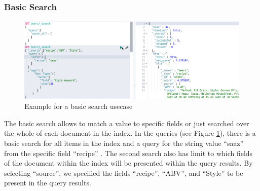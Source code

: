 \documentclass[bibliography=totoc]{article}
\begin{document}
\subsubsection{Basic Search}
\begin{figure}
    \includegraphics[height=0.4\textwidth]{basic_search.png}
    \caption{\label{beer_basic_search}Example for a basic search usecase} 
 \end{figure}
 The basic search allows to match a value to specific fields or just searched over 
 the whole of each document in the index. 
 In the queries (see Figure \ref{beer_basic_search}), there is a basic search for all items in the 
 index and a query for the string value “saaz” from the specific field 
 “recipe” . The second search also has limit to which fields of 
the document within the index will be presented within the query 
results. By selecting “source”, we specified the fields “recipe”, 
 “ABV”, and “Style” to be present in the query results.  
\end{document}

